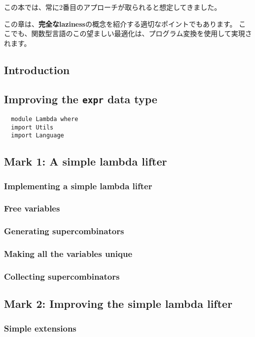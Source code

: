 \documentclass{jarticle}
\begin{document}
この本では、常に2番目のアプローチが取られると想定してきました。

この章は、\textbf{完全なlaziness}の概念を紹介する適切なポイントでもあります。
ここでも、関数型言語のこの望ましい最適化は、プログラム変換を使用して実現されます。

\subsection{Introduction}
\newpage

\subsection{Improving the \texttt{expr} data type}

\begin{verbatim}
  module Lambda where
  import Utils
  import Language
\end{verbatim}
\newpage

\subsection{Mark 1: A simple lambda lifter}
\subsubsection{Implementing a simple lambda lifter}
\subsubsection{Free variables}
\subsubsection{Generating supercombinators}
\subsubsection{Making all the variables unique}
\subsubsection{Collecting supercombinators}
\newpage

\subsection{Mark 2: Improving the simple lambda lifter}
\subsubsection{Simple extensions}
\end{document}
